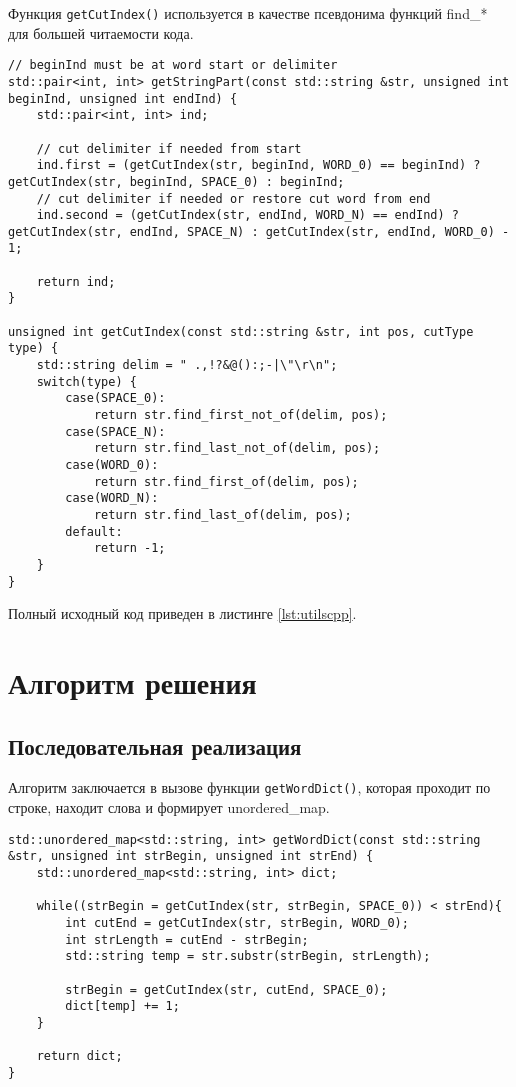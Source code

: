 Функция \texttt{getCutIndex()} используется в качестве псевдонима функций find\_* для большей читаемости кода.

\lstset{style=C++}
\begin{lstlisting}[label=lst:VHDL,caption=отрывок utils.cpp]
// beginInd must be at word start or delimiter
std::pair<int, int> getStringPart(const std::string &str, unsigned int beginInd, unsigned int endInd) {
	std::pair<int, int> ind;

	// cut delimiter if needed from start
	ind.first = (getCutIndex(str, beginInd, WORD_0) == beginInd) ? getCutIndex(str, beginInd, SPACE_0) : beginInd;
	// cut delimiter if needed or restore cut word from end
	ind.second = (getCutIndex(str, endInd, WORD_N) == endInd) ? getCutIndex(str, endInd, SPACE_N) : getCutIndex(str, endInd, WORD_0) - 1;

	return ind;	
}

unsigned int getCutIndex(const std::string &str, int pos, cutType type) {
	std::string delim = " .,!?&@():;-|\"\r\n";
	switch(type) {
		case(SPACE_0):
			return str.find_first_not_of(delim, pos);
		case(SPACE_N):
			return str.find_last_not_of(delim, pos);
		case(WORD_0):
			return str.find_first_of(delim, pos);
		case(WORD_N):
			return str.find_last_of(delim, pos);
		default:
			return -1;
	}
}
\end{lstlisting}

Полный исходный код приведен в листинге \vref{lst:utilscpp}.

\section{Алгоритм решения}

\subsection{Последовательная реализация}

Алгоритм заключается в вызове функции \texttt{getWordDict()}, которая проходит по строке, находит слова и формирует unordered\_map.

\begin{lstlisting}[label=lst:VHDL,caption=отрывок utils.cpp]
std::unordered_map<std::string, int> getWordDict(const std::string &str, unsigned int strBegin, unsigned int strEnd) {
	std::unordered_map<std::string, int> dict;

	while((strBegin = getCutIndex(str, strBegin, SPACE_0)) < strEnd){
		int cutEnd = getCutIndex(str, strBegin, WORD_0);
		int strLength = cutEnd - strBegin;
		std::string temp = str.substr(strBegin, strLength);

		strBegin = getCutIndex(str, cutEnd, SPACE_0);
		dict[temp] += 1;
	}

	return dict;
}
\end{lstlisting}

